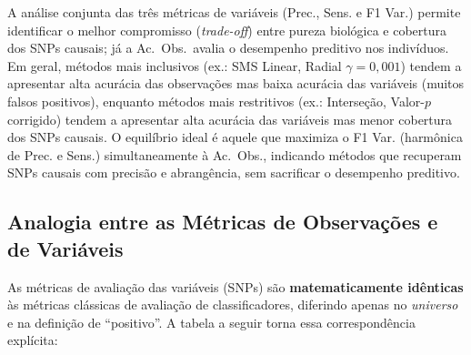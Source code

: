 \documentclass[12pt,a4paper]{article}
\newcommand{\novo}[1]{\textcolor{corNova}{#1}}
\begin{document}
\novo{A análise conjunta das três métricas de variáveis (Prec., Sens. e F1 Var.) permite identificar o melhor compromisso (\textit{trade-off}) entre pureza biológica e cobertura dos SNPs causais; já a Ac.\ Obs.\ avalia o desempenho preditivo nos indivíduos. Em geral, métodos mais inclusivos (ex.: SMS Linear, Radial $\gamma = 0{,}001$) tendem a apresentar alta acurácia das observações mas baixa acurácia das variáveis (muitos falsos positivos), enquanto métodos mais restritivos (ex.: Interseção, Valor-$p$ corrigido) tendem a apresentar alta acurácia das variáveis mas menor cobertura dos SNPs causais. O equilíbrio ideal é aquele que maximiza o F1 Var. (harmônica de Prec. e Sens.) simultaneamente à Ac.\ Obs., indicando métodos que recuperam SNPs causais com precisão e abrangência, sem sacrificar o desempenho preditivo.}

\subsection*{\novo{Analogia entre as Métricas de Observações e de Variáveis}}

\novo{As métricas de avaliação das variáveis (SNPs) são \textbf{matematicamente idênticas} às métricas clássicas de avaliação de classificadores, diferindo apenas no \emph{universo} e na definição de ``positivo''. A tabela a seguir torna essa correspondência explícita:}
\end{document}
